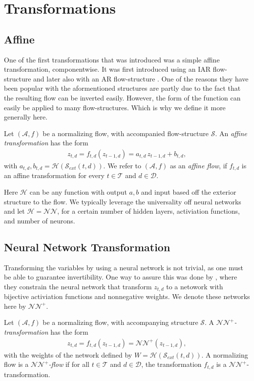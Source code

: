 \section{Transformations}
\subsection{Affine}
One of the first transformations that was introduced was a simple affine transformation, 
componentwise. It was first introduced using an IAR flow-structure and later also with 
an AR flow-structure \autocite{iaf,maf}. One of the reasons they have been popular
with the aformentioned structures are partly due to the fact that the resulting flow 
can be inverted easily. However, the form of the function can easily be applied to many flow-structures. Which
is why we define it more generally here.
\begin{definition}
    Let \((\mathcal{A}, f)\) be a normalizing flow, with accompanied flow-structure \(\mathcal{S}\).
    An \emph{affine transformation} has the form 
    \begin{align*}
        z_{t,d} = f_{t,d}(z_{t-1,d}) = a_{t,d}\,z_{t-1,d} + b_{t,d},
    \end{align*}
    with \(a_{t,d}, b_{t,d} = \mathcal{H}(\mathcal{S}_{ext}(t,d))\).
    We refer to \((\mathcal{A},f)\) as an
    \emph{affine flow}, if \(f_{t,d}\) is an affine transformation for every \(t \in \mathcal{T}\) and
    \(d \in \mathcal{D}\). 
\end{definition}
Here \(\mathcal{H}\) can be any function with output \(a,b\) and input based off the exterior structure to 
the flow. We typically leverage the universality off neural networks and let \(\mathcal{H} = \mathcal{NN}\), for 
a certain number of hidden layers, activiation functions, and number of neurons. 

\subsection{Neural Network Transformation}
Transforming the variables by using a neural network is not trivial, as one must be able to guarantee 
invertibility. One way to assure this was done by \cite{naf}, where they constrain the neural network that
transform \(z_{t,d}\) to a netowork with bijective activiation functions and nonnegative weights. We denote
these networks here by \(\mathcal{NN}^{+}\). 
\begin{definition}
    Let \((\mathcal{A}, f)\) be a normalizing flow, with accompanying structure \(\mathcal{S}\). A
    \emph{\(\mathcal{NN}^{+}\)-transformation} has the form
    \begin{align*}
        z_{t,d} = f_{t,d}(z_{t-1,d}) = \mathcal{NN}^{+}(z_{t-1,d}),
    \end{align*}
    with the weights of the network defined by \(W = \mathcal{H}(\mathcal{S}_{ext}(t,d))\). A normalizing flow
    is a \emph{\(\mathcal{NN}^{+}\)-flow}
    if for all \(t \in \mathcal{T}\) and \(d \in \mathcal{D}\), the transformation \(f_{t,d}\) is a 
    \(\mathcal{NN}^{+}\)-transformation.
\end{definition}


